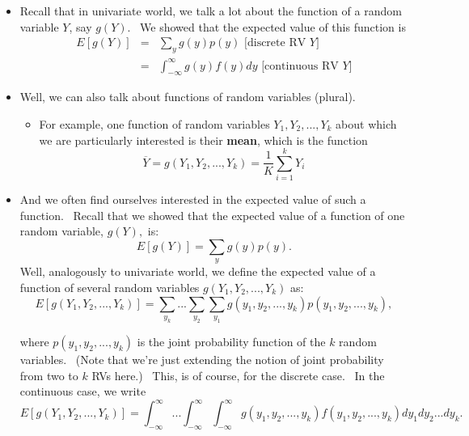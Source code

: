 \documentclass[11pt]{article}
\begin{document}
\begin{itemize}
\item Recall that in univariate world, we talk a lot about the function of a
random variable $Y$, say $g(Y).$ \ We showed that the expected value of this
function is 
\begin{eqnarray*}
E[g(Y)] &=&\sum_{y}g(y)p(y)\text{ \ [discrete RV }Y\text{]} \\
&=&\int_{-\infty }^{\infty }g(y)f(y)dy\text{ \ [continuous RV }Y\text{]}
\end{eqnarray*}

\item Well, we can also talk about functions of random variables (plural). \ 

\begin{itemize}
\item For example, one function of random variables $Y_{1},Y_{2},...,Y_{k}$
about which we are particularly interested is their \textbf{mean}, which is
the function%
\begin{equation*}
\overline{Y}=g\left( Y_{1},Y_{2},...,Y_{k}\right) =\frac{1}{K}%
\sum\limits_{i=1}^{k}Y_{i}
\end{equation*}
\end{itemize}

\item And we often find ourselves interested in the expected value of such a
function. \ Recall that we showed that the expected value of a function of
one random variable, $g(Y),$ is:%
\begin{equation*}
E[g(Y)]=\sum_{y}g(y)p(y).
\end{equation*}%
Well, analogously to univariate world, we define the expected value of a
function of several random variables $g(Y_{1},Y_{2},...,Y_{k})$ as:%
\begin{equation*}
E[g(Y_{1},Y_{2},...,Y_{k})]=\sum_{y_{k}}...\sum_{y_{2}}%
\sum_{y_{1}}g(y_{1},y_{2},...,y_{k})p(y_{1},y_{2},...,y_{k}),
\end{equation*}

where $p(y_{1},y_{2},...,y_{k})$ is the joint probability function of the $k$
random variables. \ (Note that we're just extending the notion of joint
probability from two to $k$ RVs here.) \ This, is of course, for the
discrete case. \ In the continuous case, we write%
\begin{equation*}
E[g(Y_{1},Y_{2},...,Y_{k})]=\int_{-\infty }^{\infty }...\int_{-\infty
}^{\infty }\int_{-\infty }^{\infty
}g(y_{1},y_{2},...,y_{k})f(y_{1},y_{2},...,y_{k})dy_{1}dy_{2}...dy_{k}.
\end{equation*}


\end{itemize}
\end{document}
